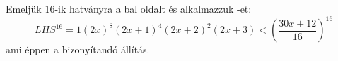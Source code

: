   Emeljük $16$-ik hatványra a bal oldalt 
   és alkalmazzuk -et:
   \begin{equation*}
   LHS^{16}=1(2x)^{8}(2x+1)^{4}(2x+2)^{2}(2x+3) < 
   {\left( \frac{30x+12}{16} \right)}^{16}
   \end{equation*}
   ami éppen a bizonyítandó állítás.
